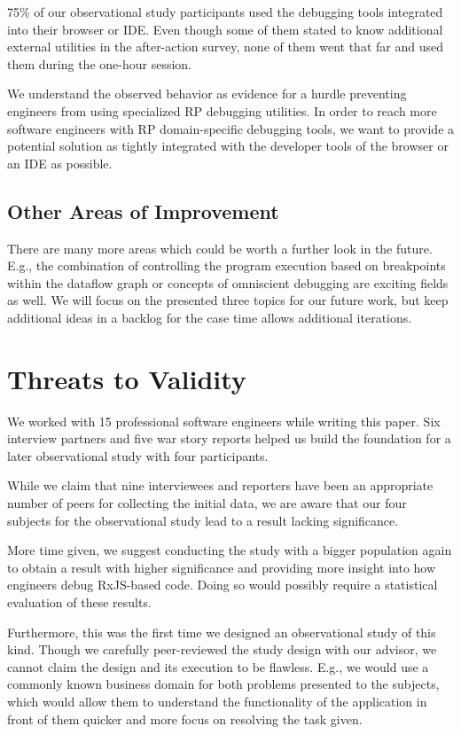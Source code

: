 \documentclass[12pt,a4paper]{article}
\begin{document}
75\% of our observational study participants used the debugging tools integrated into their browser or IDE. Even though some of them stated to know additional external utilities in the after-action survey, none of them went that far and used them during the one-hour session.

We understand the observed behavior as evidence for a hurdle preventing engineers from using specialized RP debugging utilities. In order to reach more software engineers with RP domain-specific debugging tools, we want to provide a potential solution as tightly integrated with the developer tools of the browser or an IDE as possible.

\subsection{Other Areas of Improvement}

There are many more areas which could be worth a further look in the future. E.g., the combination of controlling the program execution based on breakpoints within the dataflow graph or concepts of omniscient debugging are exciting fields as well. We will focus on the presented three topics for our future work, but keep additional ideas in a backlog for the case time allows additional iterations.

\section{Threats to Validity}
\label{sec:threats}

We worked with 15 professional software engineers while writing this paper. Six interview partners and five war story reports helped us build the foundation for a later observational study with four participants.

While we claim that nine interviewees and reporters have been an appropriate number of peers for collecting the initial data, we are aware that our four subjects for the observational study lead to a result lacking significance.

More time given, we suggest conducting the study with a bigger population again to obtain a result with higher significance and providing more insight into how engineers debug RxJS-based code. Doing so would possibly require a statistical evaluation of these results.

Furthermore, this was the first time we designed an observational study of this kind. Though we carefully peer-reviewed the study design with our advisor, we cannot claim the design and its execution to be flawless. E.g., we would use a commonly known business domain for both problems presented to the subjects, which would allow them to understand the functionality of the application in front of them quicker and more focus on resolving the task given.
\end{document}
